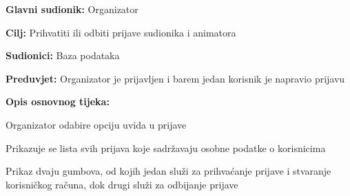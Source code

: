 \noindent {}
\begin{packed_item}

	\item \textbf{Glavni sudionik: }Organizator
	\item  \textbf{Cilj:} Prihvatiti ili odbiti prijave sudionika i animatora
	\item  \textbf{Sudionici:} Baza podataka
	\item  \textbf{Preduvjet:} Organizator je prijavljen i barem jedan korisnik je napravio prijavu
	\item  \textbf{Opis osnovnog tijeka:}

	\item[] \begin{packed_enum}

				\item Organizator odabire opciju uvida u prijave
				\item Prikazuje se lista svih prijava koje sadržavaju osobne podatke o korisnicima
				\item Prikaz dvaju gumbova, od kojih jedan služi za prihvaćanje prijave i stvaranje         korisničkog računa, dok drugi služi za odbijanje prijave

	\end{packed_enum}




\end{packed_item}
\pagebreak
\vspace{5mm} %

